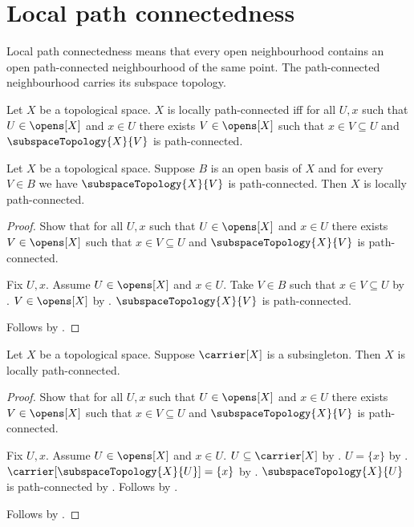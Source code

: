 \section{Local path connectedness}




Local path connectedness means that every open neighbourhood contains an
open path-connected neighbourhood of the same point. The path-connected
neighbourhood carries its subspace topology.

\begin{definition}\label{locally_path_connected}
    Let $X$ be a topological space.
    $X$ is locally path-connected iff for all $U,x$ such that
        $U\in\opens[X]$ and $x\in U$ there exists $V\in\opens[X]$ such that
        $x\in V\subseteq U$ and $\subspaceTopology{X}{V}$ is path-connected.
\end{definition}

\begin{theorem}\label{path_connected_open_basis_implies_locally_path_connected}
    Let $X$ be a topological space.
    Suppose $B$ is an open basis of $X$ and for every $V\in B$ we have
        $\subspaceTopology{X}{V}$ is path-connected.
    Then $X$ is locally path-connected.
\end{theorem}
\begin{proof}
    Show that for all $U,x$ such that $U\in\opens[X]$ and $x\in U$ there exists
        $V\in\opens[X]$ such that $x\in V\subseteq U$ and
        $\subspaceTopology{X}{V}$ is path-connected.
    \begin{subproof}
        Fix $U,x$.
        Assume $U\in\opens[X]$ and $x\in U$.
        Take $V\in B$ such that $x\in V\subseteq U$ by .
        $V\in\opens[X]$ by .
        $\subspaceTopology{X}{V}$ is path-connected.
    \end{subproof}
    Follows by .
\end{proof}

\begin{theorem}\label{subsingleton_space_is_locally_path_connected}
    Let $X$ be a topological space.
    Suppose $\carrier[X]$ is a subsingleton.
    Then $X$ is locally path-connected.
\end{theorem}
\begin{proof}
    Show that for all $U,x$ such that $U\in\opens[X]$ and $x\in U$ there exists
        $V\in\opens[X]$ such that $x\in V\subseteq U$ and
        $\subspaceTopology{X}{V}$ is path-connected.
    \begin{subproof}
        Fix $U,x$.
        Assume $U\in\opens[X]$ and $x\in U$.
        $U\subseteq\carrier[X]$ by .
        $U=\{x\}$ by .
        $\carrier[\subspaceTopology{X}{U}]=\{x\}$ by
            .
        $\subspaceTopology{X}{U}$ is path-connected by
            .
        Follows by .
    \end{subproof}
    Follows by .
\end{proof}
